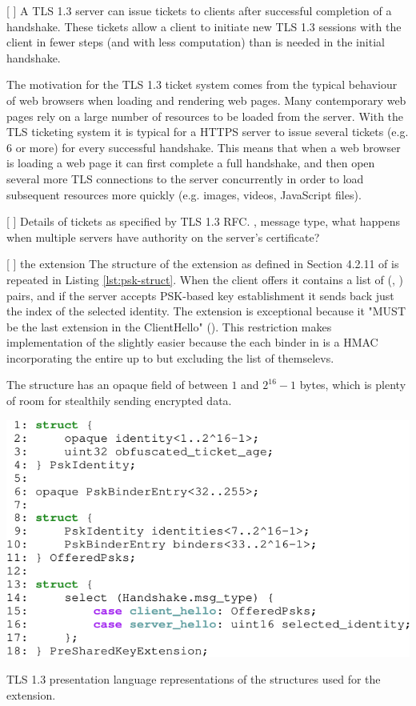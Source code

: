[ ] A TLS 1.3 server can issue tickets to clients after successful completion of a handshake. These tickets allow a client to initiate new TLS 1.3 sessions with the client in fewer steps (and with less computation) than is needed in the initial handshake.

The motivation for the TLS 1.3 ticket system comes from the typical behaviour of web browsers when loading and rendering web pages. Many contemporary web pages rely on a large number of resources to be loaded from the server. With the TLS ticketing system it is typical for a HTTPS server to issue several tickets (e.g. 6 or more) for every successful handshake. This means that when a web browser is loading a web page it can first complete a full handshake, and then open several more TLS connections to the server concurrently in order to load subsequent resources more quickly (e.g. images, videos, JavaScript files).

[ ] Details of tickets as specified by TLS 1.3 RFC. ,  message type, what happens when multiple servers have authority on the server's certificate?

[ ] the  extension
The structure of the  extension as defined in Section 4.2.11 of \cite{esni} is repeated in Listing \ref{lst:psk-struct}. When the client offers  it contains a list of (, ) pairs, and if the server accepts PSK-based key establishment it sends back just the index of the selected identity. The  extension is exceptional because it
"MUST be the last extension in the ClientHello" (\citet[Section 4.2]{esni}). This restriction makes implementation of the  slightly easier because the each binder in  is a HMAC incorporating the entire  up to but excluding the list of  themselevs.

The  structure has an opaque  field of between $1$ and $2^{16}-1$ bytes, which is plenty of room for stealthily sending encrypted data.

\begin{listing}
    \centering
    \includegraphics[width=.8\linewidth]{figure/pre_shared_key.pdf}
    \captionsetup{width=.8\linewidth} 
    \caption[Structures for the  extension]{TLS 1.3 presentation language representations of the structures used for the  extension.}
    \label{lst:psk-struct}
\end{listing}

